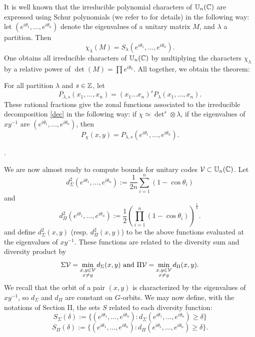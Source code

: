 \documentclass[10pt]{article}
\begin{document}
It is well known that the irreducible polynomial characters of
$\mathbb{U}_n(\mathbb{C})$ are expressed using Schur polynomials 
 (we refer to \cite{FULTON} for details) in the following way:
 let $(e^{i\theta_1},...,e^{i\theta_n})$ denote the eigenvalues of a
 unitary matrix $M$, and $\lambda$ a partition. Then
\begin{equation*}
\chi_\lambda(M)=S_\lambda(e^{i\theta_1},...,e^{i\theta_n}). 
\end{equation*}
One obtains all irreducible  characters of $\mathbb{U}_n(\mathbb{C})$ by multiplying
the characters $\chi_{\lambda}$ by a relative power of $\det(M)=\prod
e^{i\theta_k}$.
All together, we obtain the theorem:

\begin{theorem}
For all partition $\lambda$ and $s\in \mathbb{Z}$, let
\begin{equation}\label{P1}
P_{\lambda,s}(x_1,\dots,x_n)=(x_1\dots x_n)^sP_{\lambda}(x_1,\dots, x_n).
\end{equation}
These rational fractions give the zonal functions associated to the
irreducible decomposition \eqref{dec} in the following way:
if $\chi\simeq \det^s\otimes\lambda$, if the eigenvalues of $xy^{-1}$ are
$(e^{i\theta_1},...,e^{i\theta_n})$, then 
\begin{equation*}
P_{\chi}(x,y)=P_{\lambda,s}(e^{i\theta_1},...,e^{i\theta_n}).
\end{equation*}
\end{theorem}.

 We are now almost ready to compute bounds for unitary codes $\mathcal V \subset \mathbb{U}_n(\mathbb{C})$.
 Let
 $$d_\Sigma^2(e^{i\theta_1},...,e^{i\theta_n}):=\frac{1}{2n} {\sum_{i=1}^n (1-\cos \theta_i)}$$
 and 
 $$d_\Pi^2(e^{i\theta_1},...,e^{i\theta_n}):=\frac{1}{2}  \left(\prod_{i=1}^n (1-\cos \theta_i) \right)^{\frac{1}{n}}.$$
 and define $d_\Sigma^2(x,y)$ (resp. $d_\Pi^2(x,y)$) to be the above functions evaluated at the 
 eigenvalues of $xy^{-1}$. 
 These functions are related to the diversity sum and diversity product by 
 $$\Sigma \mathcal V = \min_{\substack{x,y \in \mathcal V\\x\ne y}} d_\Sigma(x,y) \textrm{ and }
 \Pi \mathcal V = \min_{\substack{x,y \in \mathcal V\\x\ne y}} d_\Pi(x,y).$$
 We recall that the orbit of a pair $(x,y)$ is characterized by the eigenvalues 
 of $xy^{-1}$, so $d_\Sigma$ and $d_\Pi$ are constant on $G$-orbits. 
 We may now define, with the notations of Section II,  the sets $S$ related to each diversity function:
 $$S_\Sigma(\delta):=\{ (e^{i\theta_1},...,e^{i\theta_n}) :  d_\Sigma(e^{i\theta_1},...,e^{i\theta_n}) \ge \delta \}$$ 
 $$S_\Pi(\delta):=\{ (e^{i\theta_1},...,e^{i\theta_n}) :  d_\Pi(e^{i\theta_1},...,e^{i\theta_n}) \ge \delta \}.$$
\end{document}
